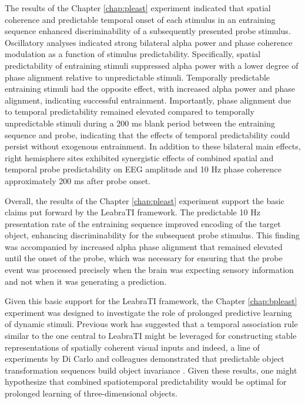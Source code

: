 \documentclass[dwyatte_dissertation.tex]{subfiles}
\begin{document}
The results of the Chapter \ref{chap:pleast} experiment indicated that spatial coherence and predictable temporal onset of each stimulus in an entraining sequence enhanced discriminability of a subsequently presented probe stimulus. Oscillatory analyses indicated strong bilateral alpha power and phase coherence modulation as a function of stimulus predictability. Specifically, spatial predictability of entraining stimuli suppressed alpha power with a lower degree of phase alignment relative to unpredictable stimuli. Temporally predictable entraining stimuli had the opposite effect, with increased alpha power and phase alignment, indicating successful entrainment. Importantly, phase alignment due to temporal predictability remained elevated compared to temporally unpredictable stimuli during a 200 ms blank period between the entraining sequence and probe, indicating that the effects of temporal predictability could persist without exogenous entrainment. In addition to these bilateral main effects, right hemisphere sites exhibited synergistic effects of combined spatial and temporal probe predictability on EEG amplitude and 10 Hz phase coherence approximately 200 ms after probe onset. 

Overall, the results of the Chapter \ref{chap:pleast} experiment support the basic claims put forward by the LeabraTI framework. The predictable 10 Hz presentation rate of the entraining sequence improved encoding of the target object, enhancing discriminability for the subsequent probe stimulus. This finding was accompanied by increased alpha phase alignment that remained elevated until the onset of the probe, which was necessary for ensuring that the probe event was processed precisely when the brain was expecting sensory information and not when it was generating a prediction. 

Given this basic support for the LeabraTI framework, the Chapter \ref{chap:bpleast} experiment was designed to investigate the role of prolonged predictive learning of dynamic stimuli. Previous work has suggested that a temporal association rule similar to the one central to LeabraTI might be leveraged for constructing stable representations of spatially coherent visual inputs \cite{StringerPerryRollsEtAl06,WallisBaddeley97,IsikLeiboPoggio12} and indeed, a line of experiments by Di Carlo and colleagues demonstrated that predictable object transformation sequences build object invariance \cite{CoxMeierOerteltEtAl05,LiDiCarlo08,LiDiCarlo10,LiDiCarlo12}. Given these results, one might hypothesize that combined spatiotemporal predictability would be optimal for prolonged learning of three-dimensional objects. 
\end{document}
